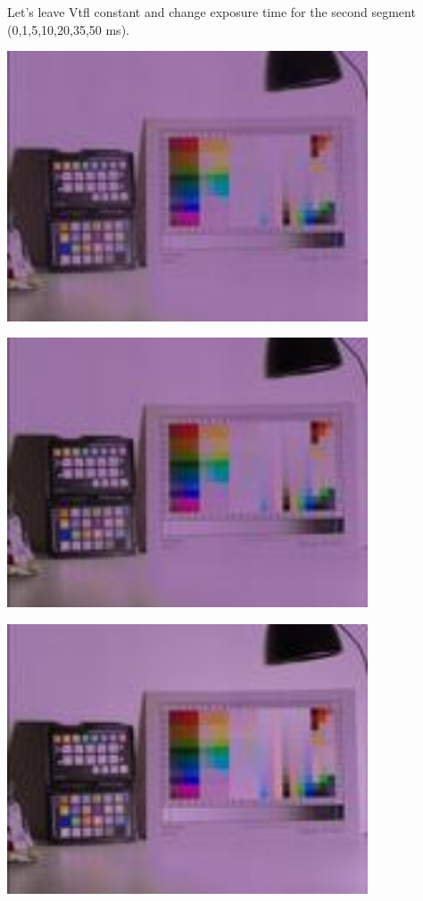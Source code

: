 Let's leave Vtfl constant and change exposure time for the second segment (0,1,5,10,20,35,50 ms). 

\begin{center}
\includegraphics[height=8cm]{images/100ms-0ms-32-tiny}
\end{center}

\begin{center}
\includegraphics[height=8cm]{images/100ms-1ms-32-tiny}
\end{center}

\begin{center}
\includegraphics[height=8cm]{images/100ms-5ms-32-tiny}
\end{center}

